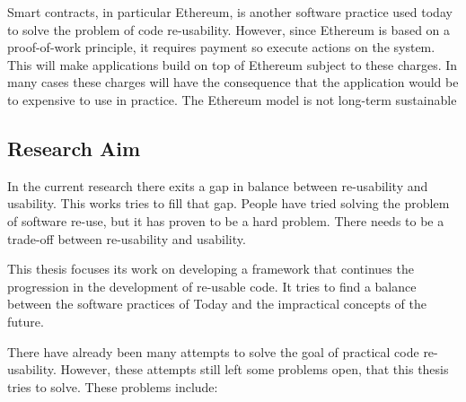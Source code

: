 Smart contracts, in particular Ethereum, is another software practice used today to solve the problem of code re-usability. However, since Ethereum is based on a proof-of-work principle, it requires payment so execute actions on the system. This will make applications build on top of Ethereum subject to these charges. In many cases these charges will have the consequence that the application would be to expensive to use in practice. The Ethereum model is not long-term sustainable

\newpage

\subsection{Research Aim}


In the current research there exits a gap in balance between re-usability and usability. This works tries to fill that gap. People have tried solving the problem of software re-use, but it has proven to be a hard problem. There needs to be a trade-off between re-usability and usability.

This thesis focuses its work on developing a framework that continues the progression in the development of re-usable code. It tries to find a balance between the software practices of Today and the impractical concepts of the future.

There have already been many attempts to solve the goal of practical code re-usability. However, these attempts still left some problems open, that this thesis tries to solve. These problems include:

